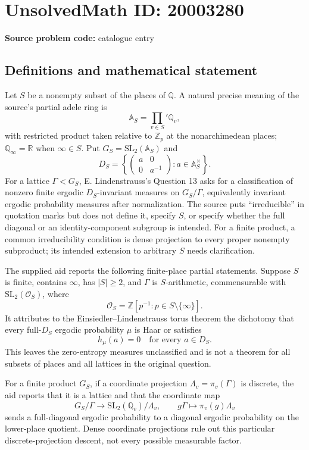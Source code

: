 \documentclass[11pt]{article}
\newcommand{\Z}{\mathbb{Z}}
\newcommand{\Q}{\mathbb{Q}}
\newcommand{\R}{\mathbb{R}}
\begin{document}
\section*{UnsolvedMath ID: 20003280}
\textbf{Source problem code:} catalogue entry
\subsection{Definitions and mathematical statement}
Let $S$ be a nonempty subset of the places of $\Q$. A natural precise meaning of the source's partial adele ring is
\[
 \mathbb A_S=\prod_{v\in S}'\Q_v,
\]
with restricted product taken relative to $\Z_p$ at the nonarchimedean places; $\Q_\infty=\R$ when $\infty\in S$. Put $G_S=\mathrm{SL}_2(\mathbb A_S)$ and
\[
 D_S=\left\{\begin{pmatrix}a&0\\0&a^{-1}\end{pmatrix}:a\in\mathbb A_S^\times\right\}.
\]
For a lattice $\Gamma<G_S$, E. Lindenstrauss's Question 13 asks for a classification of nonzero finite ergodic $D_S$-invariant measures on $G_S/\Gamma$, equivalently invariant ergodic probability measures after normalization. The source puts ``irreducible'' in quotation marks but does not define it, specify $S$, or specify whether the full diagonal or an identity-component subgroup is intended. For a finite product, a common irreducibility condition is dense projection to every proper nonempty subproduct; its intended extension to arbitrary $S$ needs clarification.

The supplied aid reports the following finite-place partial statements. Suppose $S$ is finite, contains $\infty$, has $|S|\ge2$, and $\Gamma$ is $S$-arithmetic, commensurable with $\mathrm{SL}_2(\mathcal O_S)$, where
\[
 \mathcal O_S=\Z[p^{-1}:p\in S\setminus\{\infty\}].
\]
It attributes to the Einsiedler--Lindenstrauss torus theorem the dichotomy that every full-$D_S$ ergodic probability $\mu$ is Haar or satisfies
\[
 h_\mu(a)=0\quad\text{for every }a\in D_S.
\]
This leaves the zero-entropy measures unclassified and is not a theorem for all subsets of places and all lattices in the original question.

For a finite product $G_S$, if a coordinate projection $\Lambda_v=\pi_v(\Gamma)$ is discrete, the aid reports that it is a lattice and that the coordinate map
\[
 G_S/\Gamma\longrightarrow \mathrm{SL}_2(\Q_v)/\Lambda_v,
 \qquad g\Gamma\longmapsto\pi_v(g)\Lambda_v
\]
sends a full-diagonal ergodic probability to a diagonal ergodic probability on the lower-place quotient. Dense coordinate projections rule out this particular discrete-projection descent, not every possible measurable factor.
\end{document}
